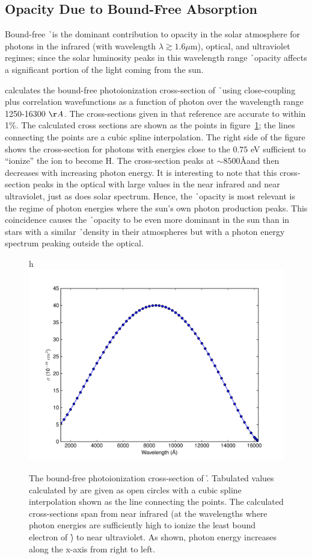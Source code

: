 \subsection{Opacity Due to Bound-Free Absorption}
Bound-free \h\ is the dominant contribution to opacity in the solar atmosphere for photons in the infrared (with wavelength $\lambda \gtrsim 1.6 \mu$m), optical, and ultraviolet regimes; since the solar luminosity peaks in this wavelength range \h\ opacity affects a significant portion of the light coming from the sun.

\cite{wishart1979} calculates the bound-free photoionization
cross-section of \h\ using close-coupling plus correlation
wavefunctions as a function of photon
over the wavelength range 1250-16300 $\AA$.  The cross-sections given
in that reference are accurate to within 1\%.
The calculated cross sections are shown as the points in
figure~\ref{fig:bfcrosssection}; the lines connecting the points are a
cubic spline interpolation.  The right side of the figure shows the
cross-section for photons with energies close to the $0.75$ eV
sufficient to ``ionize'' the \h ion to become H.  The cross-section
peaks at $\sim 8500$\AA and then decreases with increasing photon
energy.  It is interesting to note that this cross-section peaks in
the optical with large values in the near infrared and near
ultraviolet, just as does solar spectrum.  Hence, the \h\ opacity is
most relevant is the regime of photon energies where the sun's own
photon production peaks.  This coincidence causes the \h\ opacity to
be even more dominant in the sun than in stars with a similar \h\
density in their atmospheres but with a photon energy spectrum peaking
outside the optical.
\begin{figure}{h}
\includegraphics[width=150mm]{figs/boundfree_crosssection.pdf}
\caption{\label{fig:bfcrosssection}The bound-free photoionization
cross-section of \h. Tabulated values calculated
by \cite{wishart1979} are given as open circles with a cubic spline
interpolation shown as the line connecting the points.  The calculated
cross-sections span from near infrared (at the wavelengths where photon
energies are sufficiently high to ionize the least bound electron
of \h) to near ultraviolet. As shown, photon energy increases along
the x-axis from right to left.}
\end{figure}

